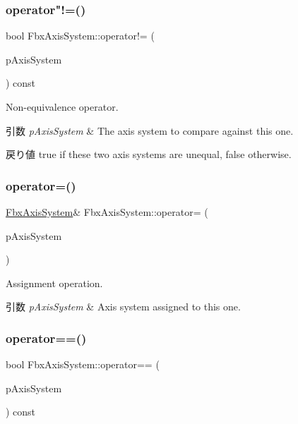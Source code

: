 \subsubsection{\texorpdfstring{operator"!=()}{operator!=()}}
{\footnotesize\ttfamily bool Fbx\+Axis\+System\+::operator!= (\begin{DoxyParamCaption}\item[{const \hyperlink{class_fbx_axis_system}{Fbx\+Axis\+System} \&}]{p\+Axis\+System }\end{DoxyParamCaption}) const}

Non-\/equivalence operator. 
\begin{DoxyParams}{引数}
{\em p\+Axis\+System} & The axis system to compare against this one. \\
\hline
\end{DoxyParams}
\begin{DoxyReturn}{戻り値}
{\ttfamily true} if these two axis systems are unequal, {\ttfamily false} otherwise. 
\end{DoxyReturn}
\mbox{\label{class_fbx_axis_system_a108da01b311416d5b60305ac170e5be5}} 
\subsubsection{\texorpdfstring{operator=()}{operator=()}}
{\footnotesize\ttfamily \hyperlink{class_fbx_axis_system}{Fbx\+Axis\+System}\& Fbx\+Axis\+System\+::operator= (\begin{DoxyParamCaption}\item[{const \hyperlink{class_fbx_axis_system}{Fbx\+Axis\+System} \&}]{p\+Axis\+System }\end{DoxyParamCaption})}

Assignment operation. 
\begin{DoxyParams}{引数}
{\em p\+Axis\+System} & Axis system assigned to this one. \\
\hline
\end{DoxyParams}
\mbox{\label{class_fbx_axis_system_a36933159c0730e52b918f9b52cb2ecc1}} 
\subsubsection{\texorpdfstring{operator==()}{operator==()}}
{\footnotesize\ttfamily bool Fbx\+Axis\+System\+::operator== (\begin{DoxyParamCaption}\item[{const \hyperlink{class_fbx_axis_system}{Fbx\+Axis\+System} \&}]{p\+Axis\+System }\end{DoxyParamCaption}) const}

